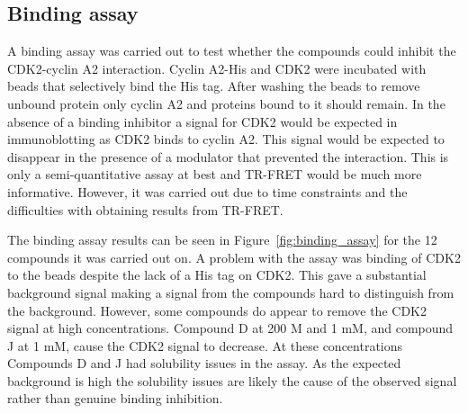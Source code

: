 \begin{figure}


\end{figure}


\subsection{Binding assay}

A binding assay was carried out to test whether the compounds could inhibit the CDK2-cyclin A2 interaction.
Cyclin A2-His and CDK2 were incubated with beads that selectively bind the His tag.
After washing the beads to remove unbound protein only cyclin A2 and proteins bound to it should remain.
In the absence of a binding inhibitor a signal for CDK2 would be expected in immunoblotting as CDK2 binds to cyclin A2.
This signal would be expected to disappear in the presence of a modulator that prevented the interaction.
This is only a semi-quantitative assay at best and TR-FRET would be much more informative.
However, it was carried out due to time constraints and the difficulties with obtaining results from TR-FRET.

The binding assay results can be seen in Figure~\ref{fig:binding_assay} for the 12 compounds it was carried out on.
A problem with the assay was binding of CDK2 to the beads despite the lack of a His tag on CDK2.
This gave a substantial background signal making a signal from the compounds hard to distinguish from the background.
However, some compounds do appear to remove the CDK2 signal at high concentrations.
Compound D at 200 \textmu M and 1 mM, and compound J at 1 mM, cause the CDK2 signal to decrease.
At these concentrations Compounds D and J had solubility issues in the assay.
As the expected background is high the solubility issues are likely the cause of the observed signal rather than genuine binding inhibition.


